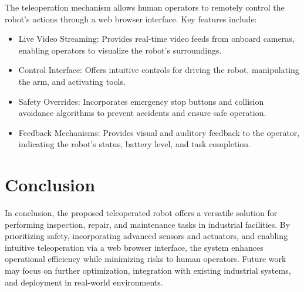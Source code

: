 \documentclass{article}
\begin{document}
The teleoperation mechanism allows human operators to remotely control the robot's actions through a web browser interface. Key features include:

\begin{itemize}
    \item Live Video Streaming: Provides real-time video feeds from onboard cameras, enabling operators to visualize the robot's surroundings.
    \item Control Interface: Offers intuitive controls for driving the robot, manipulating the arm, and activating tools.
    \item Safety Overrides: Incorporates emergency stop buttons and collision avoidance algorithms to prevent accidents and ensure safe operation.
    \item Feedback Mechanisms: Provides visual and auditory feedback to the operator, indicating the robot's status, battery level, and task completion.
\end{itemize}

\section{Conclusion}

In conclusion, the proposed teleoperated robot offers a versatile solution for performing inspection, repair, and maintenance tasks in industrial facilities. By prioritizing safety, incorporating advanced sensors and actuators, and enabling intuitive teleoperation via a web browser interface, the system enhances operational efficiency while minimizing risks to human operators. Future work may focus on further optimization, integration with existing industrial systems, and deployment in real-world environments.
\end{document}
